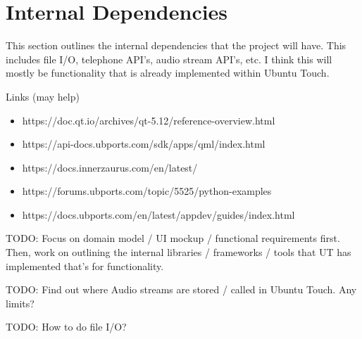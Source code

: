 \section{Internal Dependencies}

This section outlines the internal dependencies that the project will have. This includes file I/O, telephone API's, audio stream API's, etc. I think this will mostly be functionality that is already implemented within Ubuntu Touch.

Links (may help)
\begin{itemize}
	\item https://doc.qt.io/archives/qt-5.12/reference-overview.html
	\item https://api-docs.ubports.com/sdk/apps/qml/index.html
	\item https://docs.innerzaurus.com/en/latest/
	\item https://forums.ubports.com/topic/5525/python-examples
	\item https://docs.ubports.com/en/latest/appdev/guides/index.html
\end{itemize}


TODO: Focus on domain model / UI mockup / functional requirements first. Then, work on outlining the internal libraries / frameworks / tools that UT has implemented that's for functionality.

TODO: Find out where Audio streams are stored / called in Ubuntu Touch. Any limits?

TODO: How to do file I/O?

